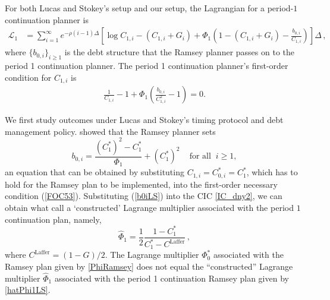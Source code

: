 \documentclass[12pt]{article}
\begin{document}
For  both Lucas and Stokey's setup and our setup, the   Lagrangian for a  period-$1$ continuation planner is %
\begin{align}\label{L1}
	{\mathcal L}^{}_1 & =  \sum_{i=1}^{\infty}  e^{-\rho (i-1)\Delta}\left[ \log C_{1, i}-  (C_{1, i}+G_{i})+ \Phi_1^{}\left( 1-(C_{1, i}+G_{i})-\frac{b_{0, i}^{}}{C_{1, i}}\right)  \right] \Delta \, , %
\end{align}
where  $\{b_{0, i}\}_{i\geq 1}$ is the   debt structure that the Ramsey planner passes on to the period 1  continuation planner. %
The period 1  continuation planner's first-order condition for $C_{1,i}$ is %
\begin{align}\label{FOC53}
	\frac{1}{C_{1, i}} -1 +\Phi_1\left( \frac{b_{0, i}}{C_{1, i}^2} -1 \right) =0.
\end{align}

We first study outcomes under Lucas and Stokey's timing protocol and debt management policy.  
\citeauthor{debortoli2021optimal}  showed that the Ramsey planner  sets 
\begin{equation}\label{b0iLS} 
	b_{0, i} = \frac{(C_{1}^*)^2-C_1^*}{\Phi_1}+(C_{1}^*)^2\,   \quad    \text{for all}\;\; i\geq 1,  
\end{equation} %
an  equation that can be  obtained by substituting $C_{1, i}=C_{0, i}^*=C_1^*$, which has to hold for   the Ramsey plan to be implemented, %
into the first-order necessary condition (\ref{FOC53}). 
Substituting (\ref{b0iLS}) into the CIC \eqref{IC_dny2}, we can  obtain  what  \citeauthor{debortoli2021optimal} call a  `constructed' Lagrange multiplier  associated with  the  period $1$ continuation plan,
namely,  %
\begin{equation}  \label{hatPhi1LS} 
	\widehat\Phi_1 =\frac{1}{2} \frac{1-C_1^*}{C_1^*-C^{\text{Laffer}}}\, , 
\end{equation}
where $C^{\text{Laffer}}=(1-G)/2$. %
{The Lagrange multiplier ${\Phi}_0^\ast$  associated with the Ramsey plan given by \eqref{PhiRamsey} does not equal the ``constructed'' Lagrange multiplier 
	$\widehat\Phi_1$ associated with the period 1 continuation Ramsey plan   given by \eqref{hatPhi1LS}.}
	
\end{document}
